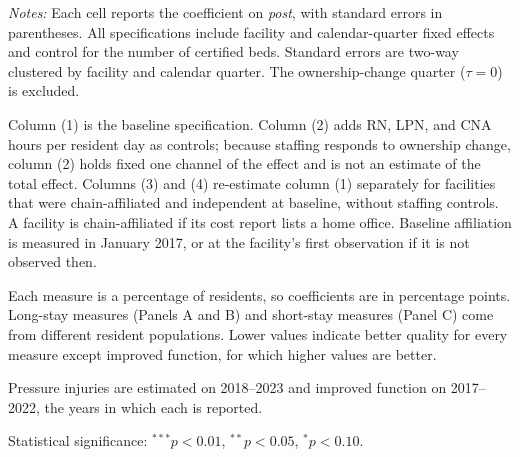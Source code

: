 \begin{table}[!ht]
\begin{threeparttable}
\begin{tablenotes}[flushleft]
\footnotesize
\item \textit{Notes:} Each cell reports the coefficient on \textit{post}, with standard errors in parentheses. All specifications include facility and calendar-quarter fixed effects and control for the number of certified beds. Standard errors are two-way clustered by facility and calendar quarter. The ownership-change quarter ($\tau = 0$) is excluded.
\item Column (1) is the baseline specification. Column (2) adds RN, LPN, and CNA hours per resident day as controls; because staffing responds to ownership change, column (2) holds fixed one channel of the effect and is not an estimate of the total effect. Columns (3) and (4) re-estimate column (1) separately for facilities that were chain-affiliated and independent at baseline, without staffing controls. A facility is chain-affiliated if its cost report lists a home office. Baseline affiliation is measured in January 2017, or at the facility's first observation if it is not observed then.
\item Each measure is a percentage of residents, so coefficients are in percentage points. Long-stay measures (Panels A and B) and short-stay measures (Panel C) come from different resident populations. Lower values indicate better quality for every measure except improved function, for which higher values are better.
\item Pressure injuries are estimated on 2018--2023 and improved function on 2017--2022, the years in which each is reported.
\item Statistical significance: $^{***}p<0.01$, $^{**}p<0.05$, $^{*}p<0.10$.
\end{tablenotes}

\end{threeparttable}
\end{table}
